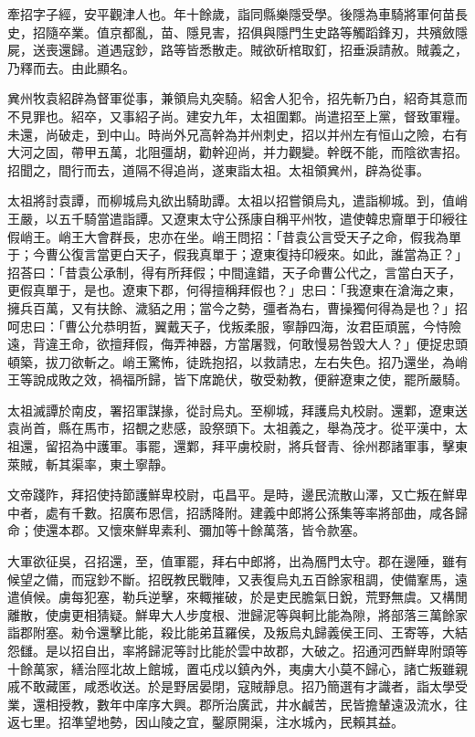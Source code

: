 \begin{pinyinscope}
 
 
 牽招字子經，安平觀津人也。年十餘歲，詣同縣樂隱受學。後隱為車騎將軍何苗長史，招隨卒業。值京都亂，苗、隱見害，招俱與隱門生史路等觸蹈鋒刃，共殯斂隱屍，送喪還歸。道遇寇鈔，路等皆悉散走。賊欲斫棺取釘，招垂淚請赦。賊義之，乃釋而去。由此顯名。
 
 
 
 
 兾州牧袁紹辟為督軍從事，兼領烏丸突騎。紹舍人犯令，招先斬乃白，紹奇其意而不見罪也。紹卒，又事紹子尚。建安九年，太祖圍鄴。尚遣招至上黨，督致軍糧。未還，尚破走，到中山。時尚外兄高幹為并州刺史，招以并州左有恒山之險，右有大河之固，帶甲五萬，北阻彊胡，勸幹迎尚，并力觀變。幹旣不能，而陰欲害招。招聞之，間行而去，道隔不得追尚，遂東詣太祖。太祖領兾州，辟為從事。
 
 
 
 
 太祖將討袁譚，而柳城烏丸欲出騎助譚。太祖以招嘗領烏丸，遣詣柳城。到，值峭王嚴，以五千騎當遣詣譚。又遼東太守公孫康自稱平州牧，遣使韓忠齎單于印綬往假峭王。峭王大會群長，忠亦在坐。峭王問招：「昔袁公言受天子之命，假我為單于；今曹公復言當更白天子，假我真單于；遼東復持印綬來。如此，誰當為正？」招荅曰：「昔袁公承制，得有所拜假；中間違錯，天子命曹公代之，言當白天子，更假真單于，是也。遼東下郡，何得擅稱拜假也？」忠曰：「我遼東在滄海之東，擁兵百萬，又有扶餘、濊貊之用；當今之勢，彊者為右，曹操獨何得為是也？」招呵忠曰：「曹公允恭明哲，翼戴天子，伐叛柔服，寧靜四海，汝君臣頑嚚，今恃險遠，背違王命，欲擅拜假，侮弄神器，方當屠戮，何敢慢易咎毀大人？」便捉忠頭頓築，拔刀欲斬之。峭王驚怖，徒跣抱招，以救請忠，左右失色。招乃還坐，為峭王等說成敗之效，禍福所歸，皆下席跪伏，敬受勑教，便辭遼東之使，罷所嚴騎。
 
 
 
 
 太祖滅譚於南皮，署招軍謀掾，從討烏丸。至柳城，拜護烏丸校尉。還鄴，遼東送袁尚首，縣在馬市，招覩之悲感，設祭頭下。太祖義之，舉為茂才。從平漢中，太祖還，留招為中護軍。事罷，還鄴，拜平虜校尉，將兵督青、徐州郡諸軍事，擊東萊賊，斬其渠率，東土寧靜。
 
 
 
 
 文帝踐阼，拜招使持節護鮮卑校尉，屯昌平。是時，邊民流散山澤，又亡叛在鮮卑中者，處有千數。招廣布恩信，招誘降附。建義中郎將公孫集等率將部曲，咸各歸命；使還本郡。又懷來鮮卑素利、彌加等十餘萬落，皆令款塞。
 
 
 
 
 大軍欲征吳，召招還，至，值軍罷，拜右中郎將，出為鴈門太守。郡在邊陲，雖有候望之備，而寇鈔不斷。招旣教民戰陣，又表復烏丸五百餘家租調，使備鞌馬，遠遣偵候。虜每犯塞，勒兵逆擊，來輙摧破，於是吏民膽氣日銳，荒野無虞。又構閒離散，使虜更相猜疑。鮮卑大人步度根、泄歸泥等與軻比能為隙，將部落三萬餘家詣郡附塞。勑令還擊比能，殺比能弟苴羅侯，及叛烏丸歸義侯王同、王寄等，大結怨讎。是以招自出，率將歸泥等討比能於雲中故郡，大破之。招通河西鮮卑附頭等十餘萬家，繕治陘北故上館城，置屯戍以鎮內外，夷虜大小莫不歸心，諸亡叛雖親戚不敢藏匿，咸悉收送。於是野居晏閉，寇賊靜息。招乃簡選有才識者，詣太學受業，還相授教，數年中庠序大興。郡所治廣武，井水鹹苦，民皆擔輦遠汲流水，往返七里。招準望地勢，因山陵之宜，鑿原開渠，注水城內，民賴其益。
 

\end{pinyinscope}
